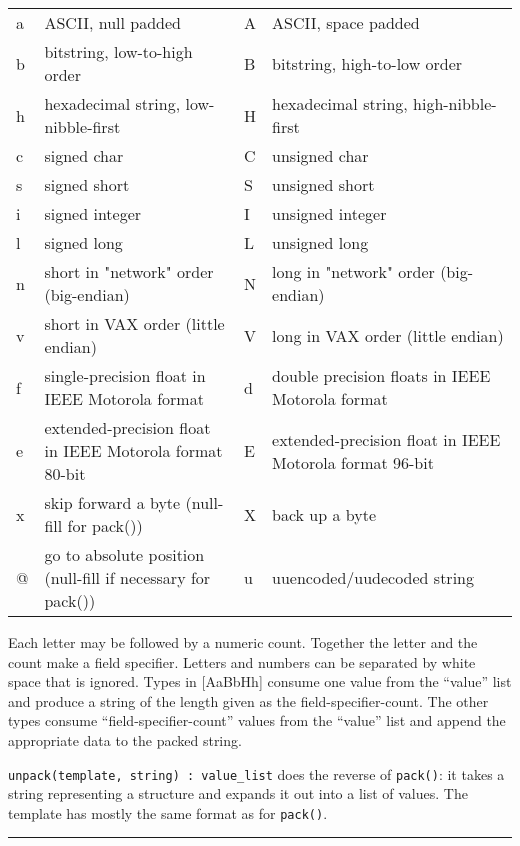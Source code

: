 \begin{flushleft}
\begin{supertabular}{|m{0.2in}|m{2.6in}|m{0.2in}|m{2.6in}|}
\hline
a & ASCII, null padded & A & ASCII, space padded\\
b & bitstring, low-to-high order & B & bitstring, high-to-low order\\
h & hexadecimal string, low-nibble-first &
H & hexadecimal string, high-nibble-first\\
c & signed char & C & unsigned char\\
s & signed short & S & unsigned short\\
i & signed integer & I & unsigned integer\\
l & signed long & L & unsigned long\\
n & short in "network" order
(big-endian) &
N & long in "network" order
(big-endian)\\
v & short in VAX order (little endian) &
V & long in VAX order (little endian)\\
f & single-precision float in IEEE Motorola format &
d & double precision floats in IEEE Motorola format\\
e & extended-precision float in IEEE Motorola format 80-bit &
E & extended-precision float in IEEE Motorola format 96-bit\\
x & skip forward a byte (null-fill for pack()) &
X & back up a byte\\
@ & go to absolute position (null-fill if necessary for
pack()) &
u & uuencoded/uudecoded string \\
\hline
\end{supertabular}
\end{flushleft}

\noindent
Each letter may be followed by a numeric count.
Together the letter and the count make a field specifier. Letters and
numbers can be separated by white space that is ignored. Types in 
[AaBbHh] consume one value from the
``value'' list and produce a string of the
length given as the field-specifier-count. The other types consume
``field-specifier-count'' values from the
``value'' list and append the appropriate
data to the packed string.

\texttt{unpack(template, string) : value\_list} does the reverse of
\texttt{pack()}: it takes a string representing a structure and expands
it out into a list of values. The template has mostly the same format
as for \texttt{pack()}.

\vspace{0.25cm}\hrule{}


